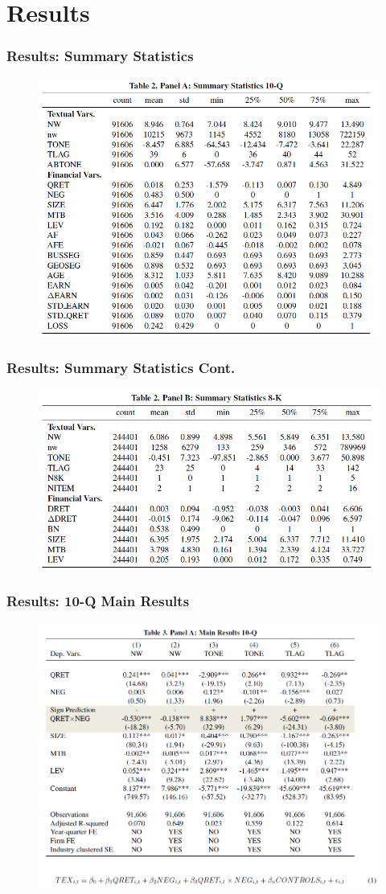 \documentclass{beamer}
\begin{document}
\section{Results}
\begin{frame}
\frametitle{Results: Summary Statistics}
\begin{figure}[h]
	\centering
	\includegraphics[width=0.7\linewidth]{tab2panA}
	\label{tab2panA}
\end{figure}

\end{frame}
\begin{frame}
	\frametitle{Results: Summary Statistics Cont.}
	\begin{figure}[h]
		\centering
		\includegraphics[width=0.65\linewidth]{tab2panB}
		\label{tab2panB}
	\end{figure}
	
\end{frame}
\begin{frame}
\frametitle{Results: 10-Q Main Results}
	\begin{figure}[h]
		\centering
		\includegraphics[width=0.7\linewidth]{tab3panA}
		\label{tab3panA}
	\end{figure}
\end{frame}
\end{document}
